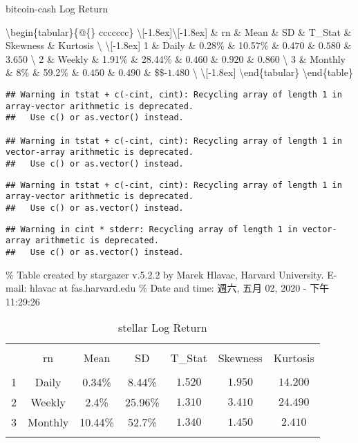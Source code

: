 \documentclass[
]{article}
\begin{document}
\caption{bitcoin-cash Log Return} 
  \label{}

\textbackslash begin\{tabular\}\{@\{\extracolsep{5pt}\} ccccccc\}
\textbackslash{[}-1.8ex{]}\hline  \hline \textbackslash{[}-1.8ex{]} \&
rn \& Mean \& SD \& T\_Stat \& Skewness \& Kurtosis \textbackslash{}
\hline \textbackslash{[}-1.8ex{]} 1 \& Daily \& 0.28\% \& 10.57\% \&
\(0.470\) \& \(0.580\) \& \(3.650\) \textbackslash{} 2 \& Weekly \&
1.91\% \& 28.44\% \& \(0.460\) \& \(0.920\) \& \(0.860\)
\textbackslash{} 3 \& Monthly \& 8\% \& 59.2\% \& \(0.450\) \& \(0.490\)
\& \$\$-\(1.480\) \textbackslash{} \hline \textbackslash{[}-1.8ex{]}
\textbackslash end\{tabular\} \textbackslash end\{table\}

\begin{verbatim}
## Warning in tstat + c(-cint, cint): Recycling array of length 1 in array-vector arithmetic is deprecated.
##   Use c() or as.vector() instead.

## Warning in tstat + c(-cint, cint): Recycling array of length 1 in vector-array arithmetic is deprecated.
##   Use c() or as.vector() instead.
\end{verbatim}

\begin{verbatim}
## Warning in tstat + c(-cint, cint): Recycling array of length 1 in array-vector arithmetic is deprecated.
##   Use c() or as.vector() instead.
\end{verbatim}

\begin{verbatim}
## Warning in cint * stderr: Recycling array of length 1 in vector-array arithmetic is deprecated.
##   Use c() or as.vector() instead.
\end{verbatim}

\% Table created by stargazer v.5.2.2 by Marek Hlavac, Harvard
University. E-mail: hlavac at fas.harvard.edu \% Date and time: 週六,
五月 02, 2020 - 下午 11:29:26

\begin{table}[!htbp] \centering 
  \caption{stellar Log Return} 
  \label{} 
\begin{tabular}{@{\extracolsep{5pt}} ccccccc} 
\\[-1.8ex]\hline 
\hline \\[-1.8ex] 
 & rn & Mean & SD & T\_Stat & Skewness & Kurtosis \\ 
\hline \\[-1.8ex] 
1 & Daily & 0.34\% & 8.44\% & $1.520$ & $1.950$ & $14.200$ \\ 
2 & Weekly & 2.4\% & 25.96\% & $1.310$ & $3.410$ & $24.490$ \\ 
3 & Monthly & 10.44\% & 52.7\% & $1.340$ & $1.450$ & $2.410$ \\ 
\hline \\[-1.8ex] 
\end{tabular} 
\end{table}
\end{document}
